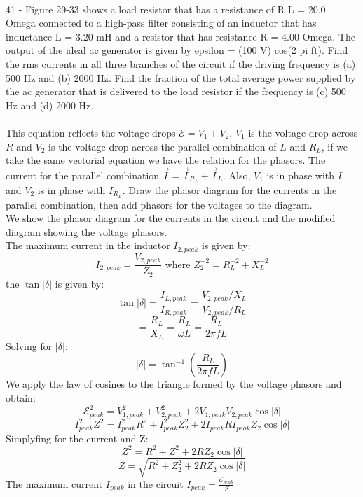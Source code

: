 \documentclass{report}
\begin{document}
\paragraph{}
41 -  Figure 29-33 shows a load resistor that has a resistance of R L = 20.0 Omega connected to a high-pass filter consisting of an inductor that has inductance L = 3.20-mH and a resistor that has resistance R = 4.00-Omega. The output of the ideal ac generator is given by epsilon = (100 V) cos(2 pi ft). Find the rms currents in all three branches of the circuit if the driving frequency is (a) 500 Hz and (b) 2000 Hz. Find the fraction of the total average power supplied by the ac generator that is delivered to the load resistor if the frequency is (c) 500 Hz and (d) 2000 Hz.\\
\\
This equation reflects the voltage drops $\mathcal{E} = V_1 + V_2$, $V_1$ is the voltage drop across $R$ and $V_2$ is the voltage drop across the parallel combination of $L$ and $R_L$, if we take the same vectorial equation we have the relation for the phasors. The current for the parallel combination $\vec I = \vec I_{R_L} + \vec I_{L}.$ Also, $V_1$ is in phase with $I$ and $V_2$ is in phase with $I_{R_L}$. Draw the phasor diagram for the currents in the parallel combination, then add phasors for the voltages to the diagram.\\
We show the phasor diagram for the currents in the circuit and the modified diagram showing the voltage phasors.\\
The maximum current in the inductor $I_{2,peak}$ is given by:
$$I_{2,peak} = \frac{V_{2,peak}}{Z_2} \text{ where } Z_2^{-2} = R_L^{-2} + X_L^{-2}$$
the $\tan \lvert \delta \rvert$ is given by:
$$\tan \lvert \delta \rvert = \frac{I_{L,peak}}{I_{R,peak}} = \frac{V_{2,peak} / X_L}{V_{2,peak} / R_L}$$
$$= \frac{R_L}{X_L} = \frac{R_L}{\omega L} = \frac{R_L}{2\pi fL}$$
Solving for $\lvert \delta \rvert$:
$$\lvert \delta \rvert = \tan^{-1} \left( \frac{R_L}{2\pi fL} \right)$$
We apply the law of cosines to the triangle formed by the voltage phasors and obtain:
$$\mathcal{E}_{peak}^2 = V_{1,peak}^2 + V_{2,peak}^2 + 2V_{1,peak}V_{2,peak}\cos \lvert \delta \rvert$$
$$I_{peak}^2Z^2 = I_{peak}^2R^2 + I_{peak}^2Z_2^2 + 2I_{peak}RI_{peak}Z_2\cos \lvert \delta \rvert$$
Simplyfing for the current and Z:
$$Z^2 = R^2 + Z^2 + 2RZ_2\cos \lvert \delta \rvert$$
$$Z = \sqrt{R^2 + Z_2^2 + 2RZ_2\cos \lvert \delta \rvert}$$
The maximum current $I_{peak}$ in the circuit $I_{peak} = \frac{\mathcal{E}_{peak}}{Z}$\\
\end{document}
